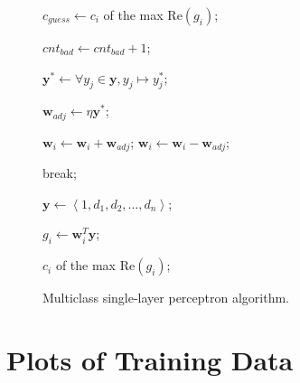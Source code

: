 \documentclass[twoside]{IEEEtran}
\begin{document}
\begin{figure}[!t]
\begin{algorithm}[H]
\begin{algorithmic}
                    \State%
                    \( c_{guess} \gets c_i \) of the max \( \mathrm{Re}\left(g_i\right) \);

                        \State%
                        \( cnt_{bad} \gets cnt_{bad} + 1 \);

                        \State%
                        \( \mathbf{y}^* \gets \forall y_j \in \mathbf{y}, y_j \mapsto y_j^* \);

                        \State%
                        \( \mathbf{w}_{adj} \gets \eta \mathbf{y}^* \);


                                \State%
                                \( \mathbf{w}_i \gets \mathbf{w}_i + \mathbf{w}_{adj} \);
                            \Else%
                                \State%
                                \( \mathbf{w}_i \gets \mathbf{w}_i - \mathbf{w}_{adj} \);
                            \EndIf%
                        \EndFor%
                    \EndIf%
                \EndFor%

                    \State%
                    break;
                \EndIf%
            \EndFor%

            \State{}

            \State%
            \( \mathbf{y} \gets \left<1, d_1, d_2, \dots, d_n \right> \);

                \State%
                \( g_i \gets \mathbf{w}_i^T \mathbf{y} \);
            \EndFor%

            \State\Return%
            \( c_i \) of the max \( \mathrm{Re}\left(g_i\right) \);
        \end{algorithmic}
    \end{algorithm}

    \caption{Multiclass single-layer perceptron algorithm.}%
    \label{slp}
\end{figure}

\section{Plots of Training Data}%
\label{train_data_plots}
\end{document}
